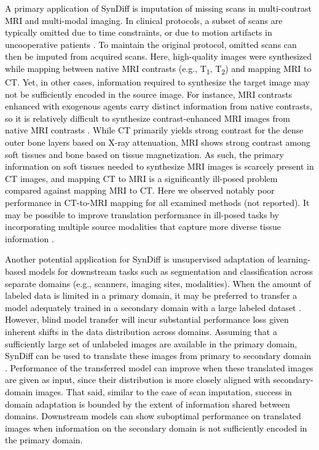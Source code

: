 \documentclass[journal,twoside,web]{ieeecolor}
\def\SB#1{\textsubscript{#1}}
\newcommand*{\revhl}{\textcolor{black}}
\begin{document}
\revhl{A primary application of SynDiff is imputation of missing scans in multi-contrast MRI and multi-modal imaging. In clinical protocols, a subset of scans are typically omitted due to time constraints, or due to motion artifacts in uncooperative patients \cite{dar2019image}. To maintain the original protocol, omitted scans can then be imputed from acquired scans. Here, high-quality images were synthesized while mapping between native MRI contrasts (e.g., T\SB{1}, T\SB{2}) and mapping MRI to CT. Yet, in other cases, information required to synthesize the target image may not be sufficiently encoded in the source image. For instance, MRI contrasts enhanced with exogenous agents carry distinct information from native contrasts, so it is relatively difficult to synthesize contrast-enhanced MRI images from native MRI contrasts \cite{lee2019}. While CT primarily yields strong contrast for the dense outer bone layers based on X-ray attenuation, MRI shows strong contrast among soft tissues and bone based on tissue magnetization. As such, the primary information on soft tissues needed to synthesize MRI images is scarcely present in CT images, and mapping CT to MRI is a significantly ill-posed problem compared against mapping MRI to CT. Here we observed notably poor performance in CT-to-MRI mapping for all examined methods (not reported). It may be possible to improve translation performance in ill-posed tasks by incorporating multiple source modalities that capture more diverse tissue information \cite{mmgan}.}

\revhl{Another potential application for SynDiff is unsupervised adaptation of learning-based models for downstream tasks such as segmentation and classification across separate domains (e.g., scanners, imaging sites, modalities). When the amount of labeled data is limited in a primary domain, it may be preferred to transfer a model adequately trained in a secondary domain with a large labeled dataset \cite{ae_uda_article,ae_uda_abstract}. However, blind model transfer will incur substantial performance loss given inherent shifts in the data distribution across domains. Assuming that a sufficiently large set of unlabeled images are available in the primary domain, SynDiff can be used to translate these images from primary to secondary domain \cite{uda_diff}. Performance of the transferred model can improve when these translated images are given as input, since their distribution is more closely aligned with secondary-domain images. That said, similar to the case of scan imputation, success in domain adaptation is bounded by the extent of information shared between domains. Downstream models can show suboptimal performance on translated images when information on the secondary domain is not sufficiently encoded in the primary domain.}
\end{document}
